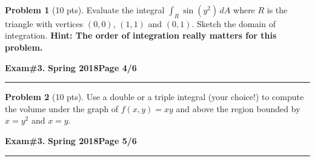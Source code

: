 \documentclass[12pt]{article}
\theoremstyle{definition}
\newtheorem{problem}{Problem}
\begin{document}
\bigskip
\begin{problem}[10 pts]
Evaluate the integral $\int_R \sin(y^2)\, dA$ where $R$ is the triangle with vertices $(0,0)$, $(1,1)$ and $(0,1)$. Sketch the domain of integration. \newline \textbf{Hint: The order of integration really matters for this problem.}

\vspace{0.5cm}
\begin{flushright}

\vspace{14cm}
\end{flushright}
\end{problem}
\newpage

\hfill{\large\bf Exam\#3.}\hfill{\large\bf
  Spring 2018}\hfill{\large\bf Page 4/6}\hrule

\bigskip
\begin{problem}[10 pts]
Use a double or a triple integral (your choice!) to compute the volume under the graph of $f(x,y)=xy$ and above the region bounded by $x=y^2$ and $x=y$.
\vspace{20cm}
\begin{flushright}
\end{flushright}
\end{problem}

\newpage

\hfill{\large\bf Exam\#3.}\hfill{\large\bf
  Spring 2018}\hfill{\large\bf Page 5/6}\hrule
\end{document}
